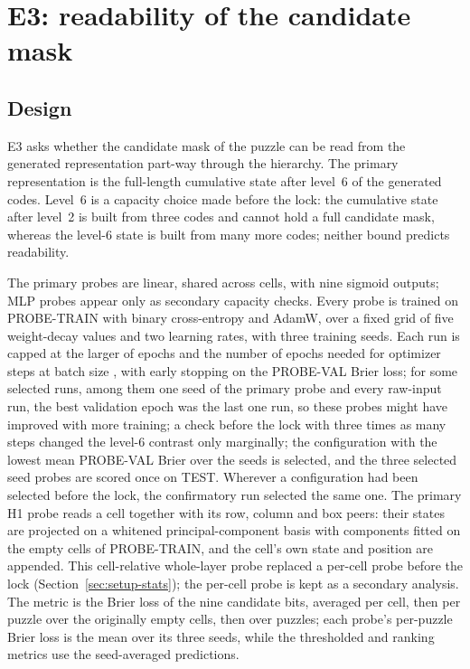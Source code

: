 \section{E3: readability of the candidate mask}
\label{sec:e3}

\subsection{Design}
\label{sec:e3-design}

E3 asks whether the candidate mask of the puzzle can be read from the generated representation part-way through the hierarchy. The primary representation is the full-length cumulative state after level~6 of the generated codes. Level~6 is a capacity choice made before the lock: the cumulative state after level~2 is built from three codes and cannot hold a full candidate mask, whereas the level-6 state is built from many more codes; neither bound predicts readability.

The primary probes are linear, shared across cells, with nine sigmoid outputs; MLP probes appear only as secondary capacity checks. Every probe is trained on PROBE-TRAIN with binary cross-entropy and AdamW, over a fixed grid of five weight-decay values and two learning rates, with three training seeds. Each run is capped at the larger of  epochs and the number of epochs needed for  optimizer steps at batch size , with early stopping on the PROBE-VAL Brier loss; for some selected runs, among them one seed of the primary probe and every raw-input run, the best validation epoch was the last one run, so these probes might have improved with more training; a check before the lock with three times as many steps changed the level-6 contrast only marginally; the configuration with the lowest mean PROBE-VAL Brier over the seeds is selected, and the three selected seed probes are scored once on TEST. Wherever a configuration had been selected before the lock, the confirmatory run selected the same one. The primary H1 probe reads a cell together with its  row, column and box peers: their states are projected on a whitened principal-component basis with  components fitted on the empty cells of PROBE-TRAIN, and the cell's own state and position are appended. This cell-relative whole-layer probe replaced a per-cell probe before the lock (Section~\ref{sec:setup-stats}); the per-cell probe is kept as a secondary analysis. The metric is the Brier loss of the nine candidate bits, averaged per cell, then per puzzle over the originally empty cells, then over puzzles; each probe's per-puzzle Brier loss is the mean over its three seeds, while the thresholded and ranking metrics use the seed-averaged predictions.

